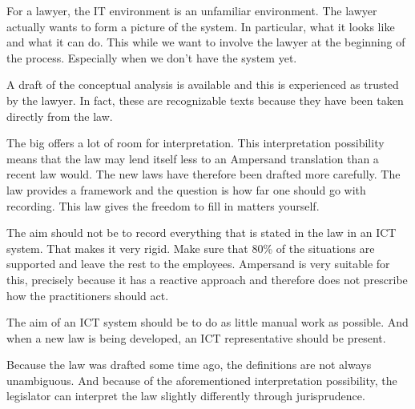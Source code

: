 For a lawyer, the IT environment is an unfamiliar environment. 
The lawyer actually wants to form a picture of the system. 
In particular, what it looks like and what it can do. 
This while we want to involve the lawyer at the beginning of the process.
Especially when we don't have the system yet.

A draft of the conceptual analysis is available and this is experienced as trusted by the lawyer. 
In fact, these are recognizable texts because they have been taken directly from the law.

The \acrshort{big} offers a lot of room for interpretation. 
This interpretation possibility means that the law may lend itself less to an Ampersand translation than a recent law would.
The new laws have therefore been drafted more carefully. 
The law provides a framework and the question is how far one should go with recording. 
This law gives the freedom to fill in matters yourself.

The aim should not be to record everything that is stated in the law in an ICT system. 
That makes it very rigid.
Make sure that 80\% of the situations are supported and leave the rest to the employees.
Ampersand is very suitable for this, precisely because it has a reactive approach and therefore does not prescribe how the practitioners should act.

The aim of an ICT system should be to do as little manual work as possible. 
And when a new law is being developed, an ICT representative should be present.

Because the law was drafted some time ago, the definitions are not always unambiguous. 
And because of the aforementioned interpretation possibility, the legislator can interpret the law slightly differently through jurisprudence.

